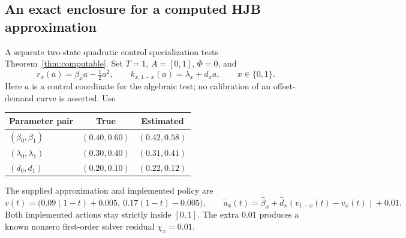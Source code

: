 \documentclass[11pt]{article}
\theoremstyle{plain}
\theoremstyle{definition}
\theoremstyle{remark}
\begin{document}
\subsection{An exact enclosure for a computed HJB approximation}

A separate two-state quadratic control specialization tests
Theorem~\ref{thm:computable}. Set \(T=1\), \(A=[0,1]\), \(\Phi=0\), and
\[
r_x(a)=\beta_xa-\tfrac12a^2,\qquad
k_{x,1-x}(a)=\lambda_x+d_xa,\qquad x\in\{0,1\}.
\]
Here \(a\) is a control coordinate for the algebraic test; no
calibration of an offset-demand curve is asserted. Use
\begin{center}
\begin{tabular}{@{}lcc@{}}
\toprule
Parameter pair&True&Estimated\\
\midrule
\((\beta_0,\beta_1)\)&\((0.40,0.60)\)&\((0.42,0.58)\)\\
\((\lambda_0,\lambda_1)\)&\((0.30,0.40)\)&\((0.31,0.41)\)\\
\((d_0,d_1)\)&\((0.20,0.10)\)&\((0.22,0.12)\)\\
\bottomrule
\end{tabular}
\end{center}
The supplied approximation and implemented policy are
\[
v(t)=\big(0.09(1-t)+0.005,\ 0.17(1-t)-0.005\big),\qquad
\widetilde a_x(t)=\widehat\beta_x+
       \widehat d_x(v_{1-x}(t)-v_x(t))+0.01.
\]
Both implemented actions stay strictly inside \([0,1]\).
The extra \(0.01\) produces a known nonzero first-order solver
residual \(\chi_x=0.01\).
\end{document}
